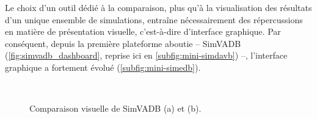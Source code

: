 Le choix d'un outil dédié à la comparaison, plus qu'à la visualisation des résultats d'un unique ensemble de simulations, entraîne nécessairement des répercussions en matière de présentation visuelle, c'est-à-dire d'interface graphique.
Par conséquent, depuis la première plateforme aboutie -- SimVADB (\cref{fig:simvadb_dashboard}, reprise ici en \cref{subfig:mini-simdavb}) --, l'interface graphique a fortement évolué (\cref{subfig:mini-simedb}).
\vspace{-0.25cm}
\begin{figure}[H]
	\centering
	\\[-1.5ex]
	\hspace{1pt}
	\vspace{-0.3cm}
	\caption[Comparaison visuelle de SimVADB et \simedb{}.]{Comparaison visuelle de SimVADB (a) et \simedb{} (b).}
	\label{fig:comparaison-simvadb-simedb}
\end{figure}


